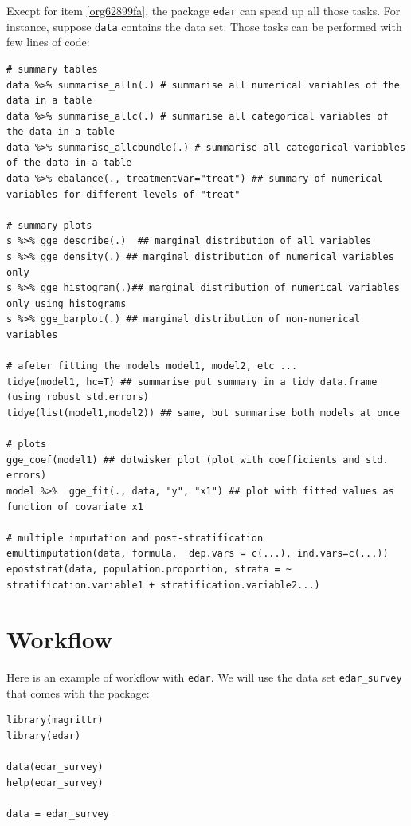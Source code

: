 \documentclass[a4paper]{article}
\begin{document}
Execpt for item \ref{org62899fa}, the package \texttt{edar} can spead up all those tasks. For instance, suppose \texttt{data} contains the data set. Those tasks can be performed with few lines of code:

\lstset{numbers=left,language=r,label=org0e1f7b4,caption= ,captionpos=b}
\begin{lstlisting}
# summary tables
data %>% summarise_alln(.) # summarise all numerical variables of the data in a table
data %>% summarise_allc(.) # summarise all categorical variables of the data in a table 
data %>% summarise_allcbundle(.) # summarise all categorical variables of the data in a table
data %>% ebalance(., treatmentVar="treat") ## summary of numerical variables for different levels of "treat"

# summary plots
s %>% gge_describe(.)  ## marginal distribution of all variables
s %>% gge_density(.) ## marginal distribution of numerical variables only
s %>% gge_histogram(.)## marginal distribution of numerical variables only using histograms
s %>% gge_barplot(.) ## marginal distribution of non-numerical variables

# afeter fitting the models model1, model2, etc ...
tidye(model1, hc=T) ## summarise put summary in a tidy data.frame (using robust std.errors)
tidye(list(model1,model2)) ## same, but summarise both models at once

# plots
gge_coef(model1) ## dotwisker plot (plot with coefficients and std. errors)
model %>%  gge_fit(., data, "y", "x1") ## plot with fitted values as function of covariate x1

# multiple imputation and post-stratification
emultimputation(data, formula,  dep.vars = c(...), ind.vars=c(...)) 
epoststrat(data, population.proportion, strata = ~ stratification.variable1 + stratification.variable2...) 
\end{lstlisting}

\section{Workflow}
\label{sec:org4ebe069}


Here is an example of workflow with \texttt{edar}. We will use the data set \texttt{edar\_survey} that comes with the package:

\lstset{numbers=left,language=r,label=org6f8ee6c,caption= ,captionpos=b}
\begin{lstlisting}
library(magrittr)
library(edar)

data(edar_survey)
help(edar_survey)

data = edar_survey
\end{lstlisting}
\end{document}
